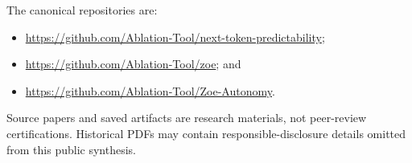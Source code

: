 \documentclass[11pt,letterpaper]{article}
\theoremstyle{definition}
\theoremstyle{plain}
\theoremstyle{remark}
\begin{document}
The canonical repositories are:
\begin{itemize}
  \item \url{https://github.com/Ablation-Tool/next-token-predictability};
  \item \url{https://github.com/Ablation-Tool/zoe}; and
  \item \url{https://github.com/Ablation-Tool/Zoe-Autonomy}.
\end{itemize}
Source papers and saved artifacts are research materials, not peer-review certifications. Historical PDFs may contain responsible-disclosure details omitted from this public synthesis.

\tableofcontents
\clearpage









\appendix


\end{document}
